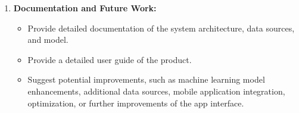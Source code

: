 \begin{enumerate}
    \item \textbf{Documentation and Future Work:}
    \begin{itemize}
        \item Provide detailed documentation of the system architecture, data sources, and model.
        \item Provide a detailed user guide of the product.
        \item Suggest potential improvements, such as machine learning model enhancements, additional data sources, mobile application integration, optimization, or further improvements of the app interface.
    \end{itemize}
\end{enumerate}

\newpage
